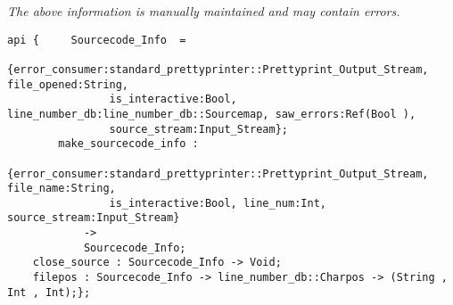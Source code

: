 \label{api:Sourcecode\_Info}

{\tiny \it The above information is manually maintained and may contain errors.}
\begin{verbatim}
api {     Sourcecode_Info  =
                {error_consumer:standard_prettyprinter::Prettyprint_Output_Stream, file_opened:String,
                is_interactive:Bool, line_number_db:line_number_db::Sourcemap, saw_errors:Ref(Bool ),
                source_stream:Input_Stream};
        make_sourcecode_info :
                {error_consumer:standard_prettyprinter::Prettyprint_Output_Stream, file_name:String,
                is_interactive:Bool, line_num:Int, source_stream:Input_Stream}
            ->
            Sourcecode_Info;
    close_source : Sourcecode_Info -> Void;
    filepos : Sourcecode_Info -> line_number_db::Charpos -> (String , Int , Int);};
\end{verbatim}
